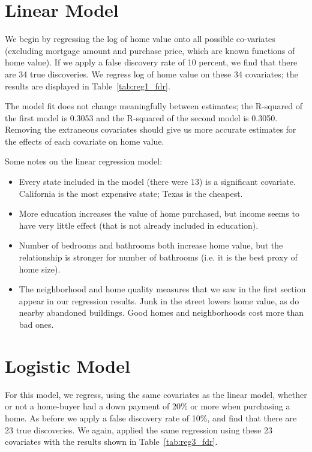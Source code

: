 \documentclass[11pt, fleqn]{article}
\begin{document}
\section{Linear Model}

We begin by regressing the log of home value onto all possible co-variates (excluding mortgage amount and purchase price, which are known functions of home value). If we apply a false discovery rate of 10 percent, we find that there are 34 true discoveries. We regress log of home value on these 34 covariates; the results are displayed in Table~\vref{tab:reg1_fdr}.

The model fit does not change meaningfully between estimates; the R-squared of the first model is 0.3053 and the R-squared of the second model is 0.3050. Removing the extraneous covariates should give us more accurate estimates for the effects of each covariate on home value.

Some notes on the linear regression model:
\begin{itemize}
  \item Every state included in the model (there were 13) is a significant covariate. California is the most expensive state; Texas is the cheapest.
  \item More education increases the value of home purchased, but income seems to have very little effect (that is not already included in education).
  \item Number of bedrooms and bathrooms both increase home value, but the relationship is stronger for number of bathrooms (i.e. it is the best proxy of home size).
  \item The neighborhood and home quality measures that we saw in the first section appear in our regression results. Junk in the street lowers home value, as do nearby abandoned buildings. Good homes and neighborhoods cost more than bad ones.
\end{itemize}



\section{Logistic Model}
For this model, we regress, using the same covariates as the linear model, whether or not a home-buyer had a down payment of 20\% or more when purchasing a home.  As before we apply a false discovery rate of 10\%, and find that there are 23 true discoveries.  We again, applied the same regression using these 23 covariates with the results shown in Table~\vref{tab:reg3_fdr}.
\end{document}
